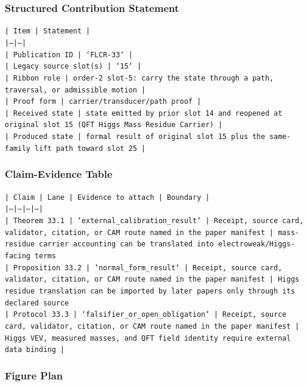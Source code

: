 \documentclass[11pt]{article}
\begin{document}
\subsubsection*{Structured Contribution Statement}

\noindent\texttt{| Item | Statement |}\\
\noindent\texttt{|---|---|}\\
\noindent\texttt{| Publication ID | `FLCR-33` |}\\
\noindent\texttt{| Legacy source slot(s) | `15` |}\\
\noindent\texttt{| Ribbon role | order-2 slot-5: carry the state through a path, traversal, or admissible motion |}\\
\noindent\texttt{| Proof form | carrier/transducer/path proof |}\\
\noindent\texttt{| Received state | state emitted by prior slot 14 and reopened at original slot 15 (QFT Higgs Mass Residue Carrier) |}\\
\noindent\texttt{| Produced state | formal result of original slot 15 plus the same-family lift path toward slot 25 |}\\

\subsubsection*{Claim-Evidence Table}

\noindent\texttt{| Claim | Lane | Evidence to attach | Boundary |}\\
\noindent\texttt{|---|---|---|---|}\\
\noindent\texttt{| Theorem 33.1 | `external\_calibration\_result` | Receipt, source card, validator, citation, or CAM route named in the paper manifest | mass-residue carrier accounting can be translated into electroweak/Higgs-facing terms}\\
\noindent\texttt{| Proposition 33.2 | `normal\_form\_result` | Receipt, source card, validator, citation, or CAM route named in the paper manifest | Higgs residue translation can be imported by later papers only through its declared source}\\
\noindent\texttt{| Protocol 33.3 | `falsifier\_or\_open\_obligation` | Receipt, source card, validator, citation, or CAM route named in the paper manifest | Higgs VEV, measured masses, and QFT field identity require external data binding |}\\

\subsubsection*{Figure Plan}
\end{document}

